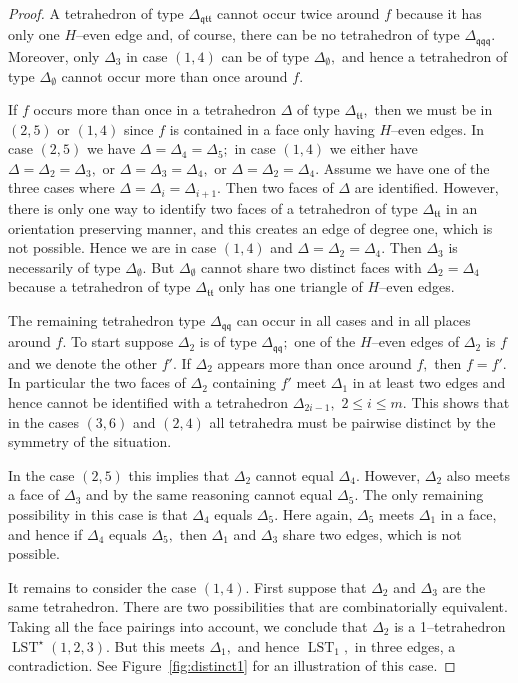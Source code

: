 \documentclass[a4paper]{gtart}
\def\lst{\operatorname{LST}}
\def\Tee{\Delta_{\emptyset}}
\def\Ttt{\Delta_{\mathfrak{tt}}}
\def\Tqtt{\Delta_{\mathfrak{qtt}}}
\def\Tqq{\Delta_{\mathfrak{qq}}}
\def\Tqqq{\Delta_{\mathfrak{qqq}}}
\theoremstyle{plain}
\theoremstyle{definition}
\theoremstyle{remark}
\numberwithin{equation}{section}
\begin{document}
\begin{proof}
A tetrahedron of type $\Tqtt$ cannot occur twice around $f$ because it has only one $H$--even edge and, of course, there can be no tetrahedron of type $\Tqqq.$ Moreover, only $\Delta_3$ in case $(1,4)$ can be of type $\Tee,$ and hence a tetrahedron of type $\Tee$ cannot occur more than once around $f.$ 

If $f$ occurs more than once in a tetrahedron $\Delta$ of type $\Ttt,$ then we must be in $(2,5)$ or $(1,4)$ since $f$ is contained in a face only having $H$--even edges. In case $(2,5)$ we have $\Delta= \Delta_4 = \Delta_5;$ in case $(1,4)$ we either have $\Delta= \Delta_2 = \Delta_3,$ or $\Delta= \Delta_3 = \Delta_4,$ or $\Delta= \Delta_2 =\Delta_4.$ Assume we have one of the three cases where $\Delta = \Delta_i = \Delta_{i+1}.$ Then two faces of $\Delta$ are identified. However, there is only one way to identify two faces of a tetrahedron of type $\Ttt$ in an orientation preserving manner, and this creates an edge of degree one, which is not possible. Hence we are in case $(1,4)$ and $\Delta= \Delta_2 =\Delta_4.$ Then $\Delta_3$ is necessarily of type $\Tee.$ But $\Tee$ cannot share two distinct faces with $\Delta_2 = \Delta_4$ because a tetrahedron of type $\Ttt$ only has one triangle of $H$--even edges.

The remaining tetrahedron type $\Tqq$ can occur in all cases and in all places around $f.$ To start suppose $\Delta_2$ is of type $\Tqq;$ one of the $H$--even edges of $\Delta_2$ is $f$ and we denote the other $f'.$ If $\Delta_2$ appears more than once around $f,$ then $f=f'.$ In particular the two faces of $\Delta_2$ containing $f'$ meet $\Delta_1$ in at least two edges and hence cannot be identified with a tetrahedron $\Delta_{2i - 1},$ $2 \leq i \leq m.$ This shows that in the cases $(3,6)$ and $(2,4)$ all tetrahedra must be pairwise distinct by the symmetry of the situation.

In the case $(2,5)$ this implies that $\Delta_2$ cannot equal $\Delta_4.$ However, $\Delta_2$ also meets a face of $\Delta_3$ and by the same reasoning cannot equal $\Delta_5.$ The only remaining possibility in this case is that $\Delta_4$ equals $\Delta_5.$ Here again, $\Delta_5$ meets $\Delta_1$ in a face, and hence if $\Delta_4$ equals $\Delta_5,$ then $\Delta_1$ and $\Delta_3$ share two edges, which is not possible.

It remains to consider the case $(1,4).$ First suppose that $\Delta_2$ and $\Delta_3$ are the same tetrahedron. There are two possibilities that are combinatorially equivalent. Taking all the face pairings into account, we conclude that $\Delta_2$ is a 1--tetrahedron $\lst^\star(1, 2, 3).$ But this meets $\Delta_1,$ and hence $\lst_1,$ in three edges, a contradiction. See Figure~\ref{fig:distinct1} for an illustration of this case.


\end{proof}
\end{document}
